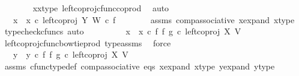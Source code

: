 \begin{isabellebody}
\ \ \ \ \ \ \isamarkupfalse%
\ x{}{\isacharunderscore}{\kern0pt}x{}{\isacharunderscore}{\kern0pt}type\ left{\isacharunderscore}{\kern0pt}coproj{\isacharunderscore}{\kern0pt}cfunc{\isacharunderscore}{\kern0pt}coprod\ \isamarkupfalse%
\ auto\ \isanewline
\ \ \ \ \isamarkupfalse%
\ \isamarkupfalse%
\ {\isachardoublequoteopen}{\isachardot}{\kern0pt}{\isachardot}{\kern0pt}{\isachardot}{\kern0pt}\ {\isacharequal}{\kern0pt}\ {\isacharparenleft}{\kern0pt}x{}\ {\isasymamalg}\ x{}{\isacharparenright}{\kern0pt}\ {\isasymcirc}\isactrlsub c\ left{\isacharunderscore}{\kern0pt}coproj\ Y\ W\ {\isasymcirc}\isactrlsub c\ f{\isachardoublequoteclose}\isanewline
\ \ \ \ \ \ \isamarkupfalse%
\ assms\ comp{\isacharunderscore}{\kern0pt}associative{}\ x{\isacharunderscore}{\kern0pt}expand\ x{\isacharunderscore}{\kern0pt}type\ \isamarkupfalse%
\ {\isacharparenleft}{\kern0pt}typecheck{\isacharunderscore}{\kern0pt}cfuncs{\isacharcomma}{\kern0pt}\ auto{\isacharparenright}{\kern0pt}\isanewline
\ \ \ \ \isamarkupfalse%
\ \isamarkupfalse%
\ {\isachardoublequoteopen}{\isachardot}{\kern0pt}{\isachardot}{\kern0pt}{\isachardot}{\kern0pt}\ {\isacharequal}{\kern0pt}\ {\isacharparenleft}{\kern0pt}x{}\ {\isasymamalg}\ x{}{\isacharparenright}{\kern0pt}\ {\isasymcirc}\isactrlsub c\ {\isacharparenleft}{\kern0pt}f\ {\isasymbowtie}\isactrlsub f\ g{\isacharparenright}{\kern0pt}\ {\isasymcirc}\isactrlsub c\ left{\isacharunderscore}{\kern0pt}coproj\ X\ V{\isachardoublequoteclose}\isanewline
\ \ \ \ \ \ \isamarkupfalse%
\ left{\isacharunderscore}{\kern0pt}coproj{\isacharunderscore}{\kern0pt}cfunc{\isacharunderscore}{\kern0pt}bowtie{\isacharunderscore}{\kern0pt}prod\ type{\isacharunderscore}{\kern0pt}assms\ \isamarkupfalse%
\ force\isanewline
\ \ \ \ \isamarkupfalse%
\ \isamarkupfalse%
\ {\isachardoublequoteopen}{\isachardot}{\kern0pt}{\isachardot}{\kern0pt}{\isachardot}{\kern0pt}\ {\isacharequal}{\kern0pt}\ {\isacharparenleft}{\kern0pt}y{}\ {\isasymamalg}\ y{}{\isacharparenright}{\kern0pt}\ {\isasymcirc}\isactrlsub c\ {\isacharparenleft}{\kern0pt}f\ {\isasymbowtie}\isactrlsub f\ g{\isacharparenright}{\kern0pt}\ {\isasymcirc}\isactrlsub c\ left{\isacharunderscore}{\kern0pt}coproj\ X\ V{\isachardoublequoteclose}\isanewline
\ \ \ \ \ \ \isamarkupfalse%
\ assms\ cfunc{\isacharunderscore}{\kern0pt}type{\isacharunderscore}{\kern0pt}def\ comp{\isacharunderscore}{\kern0pt}associative\ eqs\ x{\isacharunderscore}{\kern0pt}expand\ x{\isacharunderscore}{\kern0pt}type\ y{\isacharunderscore}{\kern0pt}expand\ y{\isacharunderscore}{\kern0pt}type\ \isamarkupfalse%

\end{isabellebody}
